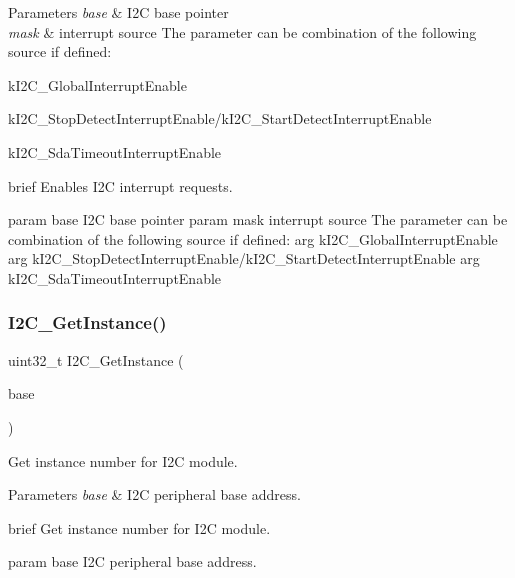 \begin{DoxyParams}{Parameters}
{\em base} & I2C base pointer \\
\hline
{\em mask} & interrupt source The parameter can be combination of the following source if defined\+: \begin{DoxyItemize}
\item k\+I2\+C\+\_\+\+Global\+Interrupt\+Enable \item k\+I2\+C\+\_\+\+Stop\+Detect\+Interrupt\+Enable/k\+I2\+C\+\_\+\+Start\+Detect\+Interrupt\+Enable \item k\+I2\+C\+\_\+\+Sda\+Timeout\+Interrupt\+Enable\end{DoxyItemize}
brief Enables I2C interrupt requests.\\
\hline
\end{DoxyParams}
param base I2C base pointer param mask interrupt source The parameter can be combination of the following source if defined\+: arg k\+I2\+C\+\_\+\+Global\+Interrupt\+Enable arg k\+I2\+C\+\_\+\+Stop\+Detect\+Interrupt\+Enable/k\+I2\+C\+\_\+\+Start\+Detect\+Interrupt\+Enable arg k\+I2\+C\+\_\+\+Sda\+Timeout\+Interrupt\+Enable \mbox{\label{group__i2c__driver_ga07cc6bd20f700249c335893427bf462a}} 
\subsubsection{\texorpdfstring{I2C\_GetInstance()}{I2C\_GetInstance()}}
{\footnotesize\ttfamily uint32\+\_\+t I2\+C\+\_\+\+Get\+Instance (\begin{DoxyParamCaption}\item[{\mbox{\hyperlink{struct_i2_c___type}{I2\+C\+\_\+\+Type}} $\ast$}]{base }\end{DoxyParamCaption})}



Get instance number for I2C module. 


\begin{DoxyParams}{Parameters}
{\em base} & I2C peripheral base address.\\
\hline
\end{DoxyParams}
brief Get instance number for I2C module.

param base I2C peripheral base address. \mbox{\label{group__i2c__driver_gadcf7122f0a38d4d9da0f052fcb167957}} 
